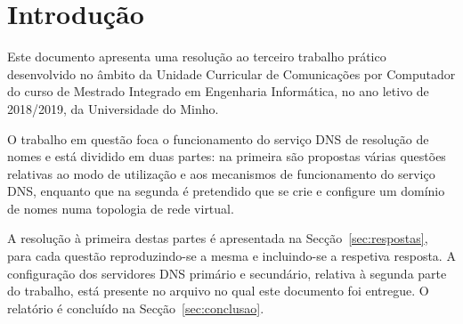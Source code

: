 
\section{Introdução}

Este documento apresenta uma resolução ao terceiro trabalho prático desenvolvido no âmbito da Unidade Curricular de Comunicações por Computador do curso de Mestrado Integrado em Engenharia Informática, no ano letivo de 2018/2019, da Universidade do Minho.

O trabalho em questão foca o funcionamento do serviço DNS de resolução de nomes e está dividido em duas partes: na primeira são propostas várias questões relativas ao modo de utilização e aos mecanismos de funcionamento do serviço DNS, enquanto que na segunda é pretendido que se crie e configure um domínio de nomes numa topologia de rede virtual.


A resolução à primeira destas partes é apresentada na Secção~\ref{sec:respostas}, para cada questão reproduzindo-se a mesma e incluindo-se a respetiva resposta. A configuração dos servidores DNS primário e secundário, relativa à segunda parte do trabalho, está presente no arquivo no qual este documento foi entregue. O relatório é concluído na Secção~\ref{sec:conclusao}.

